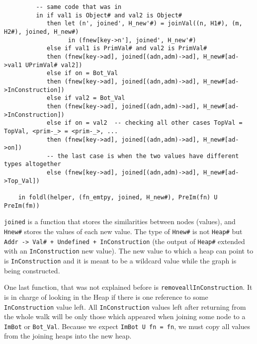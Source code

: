 \begin{verbatim}
         -- same code that was in
         in if val1 is Object# and val2 is Object#
            then let (n', joined', H_new'#) = joinVal((n, H1#), (m, H2#), joined, H_new#)
                  in (fnew[key->n'], joined', H_new'#)
            else if val1 is PrimVal# and val2 is PrimVal#
            then (fnew[key->ad], joined[(adn,adm)->ad], H_new#[ad->val1 UPrimVal# val2])
            else if on = Bot_Val
            then (fnew[key->ad], joined[(adn,adm)->ad], H_new#[ad->InConstruction])
            else if val2 = Bot_Val
            then (fnew[key->ad], joined[(adn,adm)->ad], H_new#[ad->InConstruction])
            else if on = val2  -- checking all other cases TopVal = TopVal, <prim-_> = <prim-_>, ...
            then (fnew[key->ad], joined[(adn,adm)->ad], H_new#[ad->on])
            -- the last case is when the two values have different types altogether
            else (fnew[key->ad], joined[(adn,adm)->ad], H_new#[ad->Top_Val])

    in foldl(helper, (fn_emtpy, joined, H_new#), PreIm(fn) U PreIm(fm))
\end{verbatim}

{}

\texttt{joined} is a function that stores the similarities between nodes
(values), and \texttt{Hnew\#} stores the values of each new value. The
type of \texttt{Hnew\#} is not \texttt{Heap\#} but
\texttt{Addr\ -\textgreater{}\ Val\#\ +\ Undefined\ +\ InConstruction}
(the output of \texttt{Heap\#} extended with an \texttt{InConstruction}
new value). The new value to which a heap can point to is
\texttt{InConstruction} and it is meant to be a wildcard value while the
graph is being constructed.

{}

One last function, that was not explained before is
\texttt{removeallInConstruction}. It is in charge of looking in the Heap
if there is one reference to some \texttt{InConstruction} value left.
All \texttt{InConstruction} values left after returning from the whole
walk will be only those which appeared when joining some node to a
\texttt{ImBot} or \texttt{Bot\_Val}. Because we expect
\texttt{ImBot\ U\ fn\ =\ fn}, we must copy all values from the joining
heaps into the new heap.

